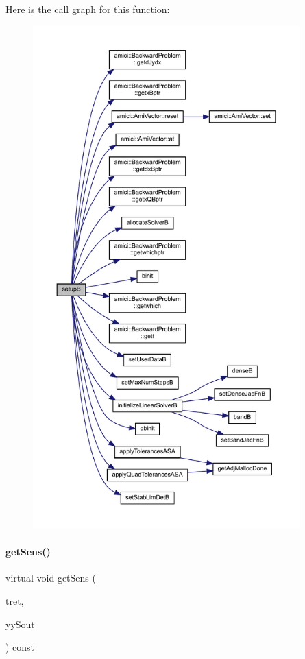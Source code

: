 Here is the call graph for this function\+:
\nopagebreak
\begin{figure}[H]
\begin{center}
\leavevmode
\includegraphics[height=550pt]{classamici_1_1_solver_ad053924ece01f2958b5bc2332f56a0d6_cgraph}
\end{center}
\end{figure}
\mbox{\label{classamici_1_1_solver_a0db027ca9e9778c0b40afdb80f11a3af}} 
\paragraph{\texorpdfstring{getSens()}{getSens()}}
{\footnotesize\ttfamily virtual void get\+Sens (\begin{DoxyParamCaption}\item[{\mbox{\hyperlink{namespaceamici_a1bdce28051d6a53868f7ccbf5f2c14a3}{realtype}} $\ast$}]{tret,  }\item[{\mbox{\hyperlink{classamici_1_1_ami_vector_array}{Ami\+Vector\+Array}} $\ast$}]{yy\+Sout }\end{DoxyParamCaption}) const\hspace{0.3cm}{\ttfamily [pure virtual]}}


